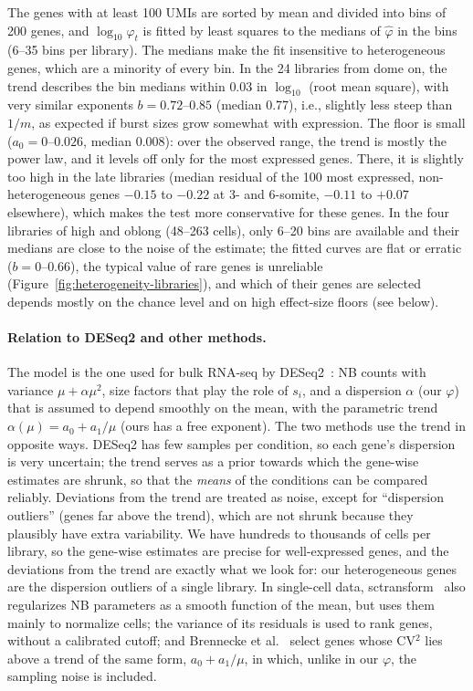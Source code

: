 \documentclass[11pt,a4paper]{article}
\begin{document}
The genes with at least 100 UMIs are sorted by mean and divided into bins of 200 genes, and $\log_{10}\varphi_t$ is fitted by least squares to the medians of $\hat\varphi$ in the bins (6--35 bins per library). The medians make the fit insensitive to heterogeneous genes, which are a minority of every bin. In the 24 libraries from dome on, the trend describes the bin medians within 0.03 in $\log_{10}$ (root mean square), with very similar exponents $b = 0.72$--$0.85$ (median 0.77), i.e., slightly less steep than $1/m$, as expected if burst sizes grow somewhat with expression. The floor is small ($a_0 = 0$--$0.026$, median 0.008): over the observed range, the trend is mostly the power law, and it levels off only for the most expressed genes. There, it is slightly too high in the late libraries (median residual of the 100 most expressed, non-heterogeneous genes $-0.15$ to $-0.22$ at 3- and 6-somite, $-0.11$ to $+0.07$ elsewhere), which makes the test more conservative for these genes. In the four libraries of high and oblong (48--263 cells), only 6--20 bins are available and their medians are close to the noise of the estimate; the fitted curves are flat or erratic ($b = 0$--$0.66$), the typical value of rare genes is unreliable (Figure~\ref{fig:heterogeneity-libraries}), and which of their genes are selected depends mostly on the chance level and on high effect-size floors (see below).

\paragraph{Relation to DESeq2 and other methods.} The model is the one used for bulk RNA-seq by DESeq2~\cite{love2014deseq2}: NB counts with variance $\mu + \alpha\mu^2$, size factors that play the role of $s_i$, and a dispersion $\alpha$ (our $\varphi$) that is assumed to depend smoothly on the mean, with the parametric trend $\alpha(\mu) = a_0 + a_1/\mu$ (ours has a free exponent). The two methods use the trend in opposite ways. DESeq2 has few samples per condition, so each gene's dispersion is very uncertain; the trend serves as a prior towards which the gene-wise estimates are shrunk, so that the \emph{means} of the conditions can be compared reliably. Deviations from the trend are treated as noise, except for ``dispersion outliers'' (genes far above the trend), which are not shrunk because they plausibly have extra variability. We have hundreds to thousands of cells per library, so the gene-wise estimates are precise for well-expressed genes, and the deviations from the trend are exactly what we look for: our heterogeneous genes are the dispersion outliers of a single library. In single-cell data, sctransform~\cite{hafemeister2019sctransform} also regularizes NB parameters as a smooth function of the mean, but uses them mainly to normalize cells; the variance of its residuals is used to rank genes, without a calibrated cutoff; and Brennecke et al.~\cite{brennecke2013noise} select genes whose CV$^2$ lies above a trend of the same form, $a_0 + a_1/\mu$, in which, unlike in our $\varphi$, the sampling noise is included.
\end{document}
